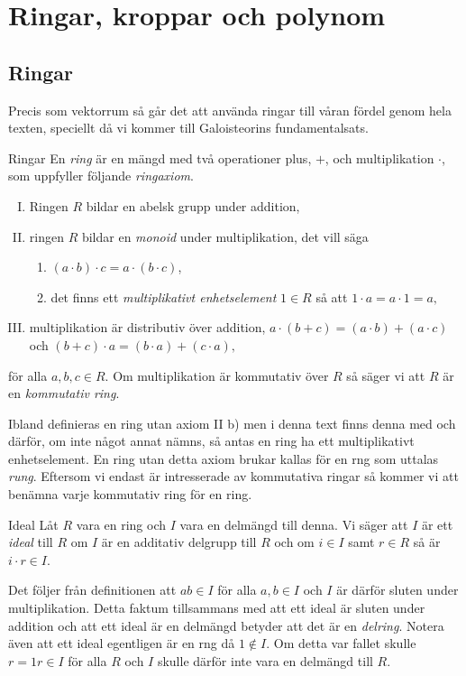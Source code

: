 \documentclass{article}
\theoremstyle{definition}
\begin{document}
\section{Ringar, kroppar och polynom}
\subsection{Ringar}
Precis som vektorrum så går det att använda ringar till våran fördel genom hela texten, speciellt då vi kommer till
Galoisteorins fundamentalsats.
\begin{mydef}{Ringar}{}
  En \textit{ring} är en mängd med två operationer plus, $+$, och multiplikation $\cdot$, som uppfyller följande \textit{ringaxiom}.
  \begin{enumerate}[I)]
    \item Ringen $R$ bildar en abelsk grupp under addition,
    \item ringen $R$ bildar en \textit{monoid} under multiplikation, det vill säga 
    \begin{enumerate}
      \item $(a \cdot b) \cdot c = a \cdot (b \cdot c)$,
      \item det finns ett \textit{multiplikativt enhetselement} $1 \in R$ så att $1 \cdot a = a \cdot 1 = a,$
    \end{enumerate}
    \item multiplikation är distributiv över addition, $a \cdot (b+c) = (a \cdot b) + (a \cdot c)$ och $(b + c) \cdot a = (b \cdot a) + (c \cdot a),$
  \end{enumerate}
  för alla $a, b, c \in R$. Om multiplikation är kommutativ över $R$ så säger vi att $R$ är en \textit{kommutativ ring}. 
\end{mydef}
Ibland definieras en ring utan axiom II b) men i denna text finns denna med och därför, om inte något annat nämns, så antas en ring ha ett multiplikativt enhetselement. 
En ring utan detta axiom brukar kallas för en rng som uttalas \textit{rung}. Eftersom vi endast är intresserade av kommutativa ringar så kommer vi 
att benämna varje kommutativ ring för en ring. 

\begin{mydef}{Ideal}{}
  Låt $R$ vara en ring och $I$ vara en delmängd till denna. Vi säger att $I$ är ett \textit{ideal} till $R$ om $I$ är en additativ delgrupp till $R$
  och om $i \in I$ samt $r \in R$ så är $i \cdot r \in I$. 
\end{mydef}
Det följer från definitionen att $ab \in I$ för alla $a, b \in I$ och $I$ är därför sluten under multiplikation. Detta faktum tillsammans 
med att ett ideal är sluten under addition och att ett ideal är en delmängd betyder att det är en \textit{delring}.
Notera även att ett ideal egentligen är en rng då $1 \notin I$. Om detta var fallet skulle 
$r = 1r \in I$ för alla $R$ och $I$ skulle därför inte vara en delmängd till $R$. 
\end{document}
